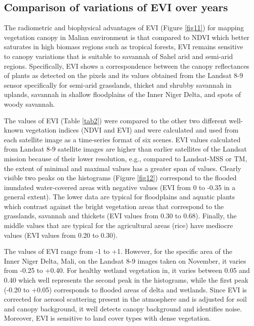 \documentclass[12pt,a4paper,oneside]{article}
\def \newpar{\vspace{6pt}}
\begin{document}
\subsection*{Comparison of variations of EVI over years}

\newpar The radiometric and biophysical advantages of EVI (Figure \ref{fig11}) for mapping vegetation canopy in Malian environment is that compared to NDVI which better saturates in high biomass regions such as tropical forests, EVI remains sensitive to canopy variations that is suitable to savannah of Sahel arid and semi-arid regions. Specifically, EVI shows a correspondence between the canopy reflectances of plants as detected on the pixels and its values obtained from the Landsat 8-9 sensor specifically for semi-arid grasslands, thicket and shrubby savannah in uplands, savannah in shallow floodplains of the Inner Niger Delta, and spots of woody savannah. 

\newpar The values of EVI (Table \ref{tab2}) were compared to the other two different well-known vegetation indices (NDVI and EVI) and were calculated and used from each satellite image as a time-series format of six scenes. EVI values calculated from Landsat 8-9 satellite images are higher than earlier satellites of the Landsat mission because of their lower resolution, e.g., compared to Landsat-MSS or TM, the extent of minimal and maximal values has a greater span of values. Clearly visible two peaks on the histograms (Figure \ref{fig12}) correspond to the flooded inundated water-covered areas with negative values (EVI from 0 to -0.35 in a general extent). The lower data are typical for floodplains and aquatic plants which contrast against the bright vegetation areas that correspond to the grasslands, savannah and thickets (EVI values from 0.30 to 0.68). Finally, the middle values that are typical for the agricultural areas (rice) have mediocre values (EVI values from 0.20 to 0.30). 

\newpar The values of EVI range from -1 to +1. However, for the specific area of the Inner Niger Delta, Mali, on the Landsat 8-9 images taken on November, it varies from -0.25 to +0.40. For healthy wetland vegetation in, it varies between 0.05 and 0.40 which well represents the second peak in the histograms, while the first peak (-0.20 to +0.05) corresponds to flooded areas of delta and wetlands. Since EVI is corrected for aerosol scattering present in the atmosphere and is adjusted for soil and canopy background, it well detects canopy background and identifies noise. Moreover, EVI is sensitive to land cover types with dense vegetation.
\end{document}
